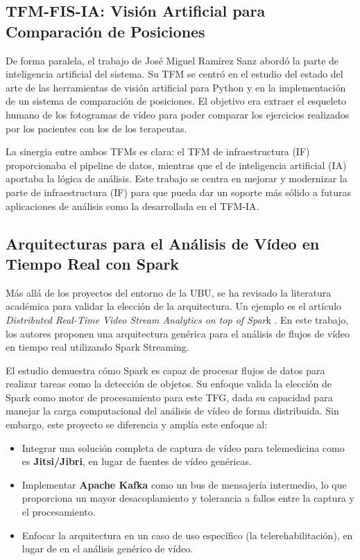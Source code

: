 \subsection{TFM-FIS-IA: Visión Artificial para Comparación de Posiciones}
De forma paralela, el trabajo de José Miguel Ramírez Sanz \cite{ramirez_tfm_ia} abordó la parte de inteligencia artificial del sistema. Su TFM se centró en el estudio del estado del arte de las herramientas de visión artificial para Python y en la implementación de un sistema de comparación de posiciones. El objetivo era extraer el esqueleto humano de los fotogramas de vídeo para poder comparar los ejercicios realizados por los pacientes con los de los terapeutas.

La sinergia entre ambos TFMs es clara: el TFM de infraestructura (IF) proporcionaba el pipeline de datos, mientras que el de inteligencia artificial (IA) aportaba la lógica de análisis. Este trabajo se centra en mejorar y modernizar la parte de infraestructura (IF) para que pueda dar un soporte más sólido a futuras aplicaciones de análisis como la desarrollada en el TFM-IA.

\subsection{Arquitecturas para el Análisis de Vídeo en Tiempo Real con Spark}
\label{subsec:trab_rel_academico}
Más allá de los proyectos del entorno de la UBU, se ha revisado la literatura académica para validar la elección de la arquitectura. Un ejemplo es el artículo \textit{Distributed Real-Time Video Stream Analytics on top of Spar}k \cite{karimov2018distributed}. En este trabajo, los autores proponen una arquitectura genérica para el análisis de flujos de vídeo en tiempo real utilizando Spark Streaming.

El estudio demuestra cómo Spark es capaz de procesar flujos de datos para realizar tareas como la detección de objetos. Su enfoque valida la elección de Spark como motor de procesamiento para este TFG, dada su capacidad para manejar la carga computacional del análisis de vídeo de forma distribuida. Sin embargo, este proyecto se diferencia y amplía este enfoque al:
\begin{itemize}
    \item Integrar una solución completa de captura de vídeo para telemedicina como es \textbf{Jitsi/Jibri}, en lugar de fuentes de vídeo genéricas.
    \item Implementar \textbf{Apache Kafka} como un bus de mensajería intermedio, lo que proporciona un mayor desacoplamiento y tolerancia a fallos entre la captura y el procesamiento.
    \item Enfocar la arquitectura en un caso de uso específico (la telerehabilitación), en lugar de en el análisis genérico de vídeo.
\end{itemize}